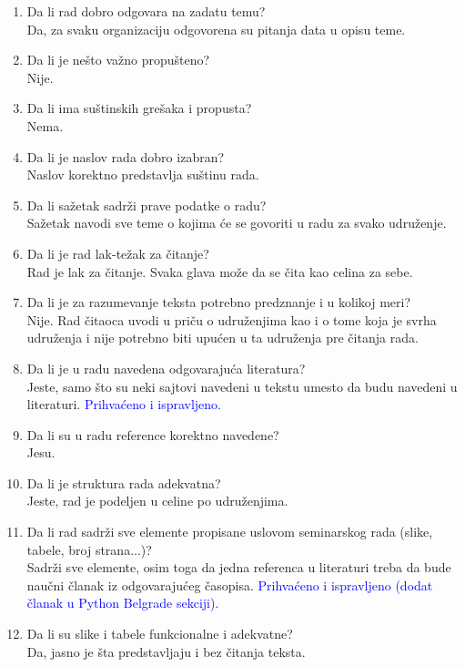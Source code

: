 \documentclass[a4paper]{report}
\newcommand{\odgovor}[1]{\textcolor{blue}{#1}}
\begin{document}
\begin{enumerate}
\item Da li rad dobro odgovara na zadatu temu?\\
Da, za svaku organizaciju odgovorena su pitanja data u opisu teme.
\item Da li je nešto važno propušteno?\\
Nije.
\item Da li ima suštinskih grešaka i propusta?\\
Nema.
\item Da li je naslov rada dobro izabran?\\
Naslov korektno predstavlja suštinu rada.
\item Da li sažetak sadrži prave podatke o radu?\\
Sažetak navodi sve teme o kojima će se govoriti u radu za svako udruženje.
\item Da li je rad lak-težak za čitanje?\\
Rad je lak za čitanje. Svaka glava može da se čita kao celina za sebe.
\item Da li je za razumevanje teksta potrebno predznanje i u kolikoj meri?\\
Nije. Rad čitaoca uvodi u priču o udruženjima kao i o tome koja je svrha udruženja i nije potrebno biti upućen u ta udruženja pre čitanja rada.
\item Da li je u radu navedena odgovarajuća literatura?\\
Jeste, samo što su neki sajtovi navedeni u tekstu umesto da budu navedeni u literaturi.
\odgovor{Prihvaćeno i ispravljeno.}
\item Da li su u radu reference korektno navedene?\\
Jesu.
\item Da li je struktura rada adekvatna?\\
Jeste, rad je podeljen u celine po udruženjima.
\item Da li rad sadrži sve elemente propisane uslovom seminarskog rada (slike, tabele, broj strana...)?\\
Sadrži sve elemente, osim toga da jedna referenca u literaturi treba da bude naučni članak iz odgovarajućeg časopisa.
\odgovor{Prihvaćeno i ispravljeno (dodat članak u Python Belgrade sekciji).}
\item Da li su slike i tabele funkcionalne i adekvatne?\\
Da, jasno je šta predstavljaju i bez čitanja teksta.
\end{enumerate}
\end{document}
